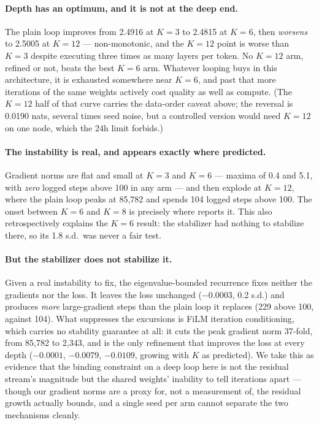 \documentclass[11pt,a4paper]{article}
\begin{document}
\paragraph{Depth has an optimum, and it is not at the deep end.} The plain loop improves from 2.4916
at $K{=}3$ to 2.4815 at $K{=}6$, then \emph{worsens} to 2.5005 at $K{=}12$ --- non-monotonic, and
the $K{=}12$ point is worse than $K{=}3$ despite executing three times as many layers per token. No
$K{=}12$ arm, refined or not, beats the best $K{=}6$ arm. Whatever looping buys in this architecture,
it is exhausted somewhere near $K{=}6$, and past that more iterations of the same weights actively
cost quality as well as compute. (The $K{=}12$ half of that curve carries the data-order caveat
above; the reversal is 0.0190 nats, several times seed noise, but a controlled version would need
$K{=}12$ on one node, which the 24h limit forbids.)

\paragraph{The instability is real, and appears exactly where predicted.} Gradient norms are flat and
small at $K{=}3$ and $K{=}6$ --- maxima of 0.4 and 5.1, with \emph{zero} logged steps above 100 in
any arm --- and then explode at $K{=}12$, where the plain loop peaks at 85{,}782 and spends 104
logged steps above 100. The onset between $K{=}6$ and $K{=}8$ is precisely where \cite{parcae}
reports it. This also retrospectively explains the $K{=}6$ result: the stabilizer had nothing to
stabilize there, so its 1.8 s.d.\ was never a fair test.

\paragraph{But the stabilizer does not stabilize it.} Given a real instability to fix, the
eigenvalue-bounded recurrence fixes neither the gradients nor the loss. It leaves the loss unchanged
($-0.0003$, 0.2 s.d.) and produces \emph{more} large-gradient steps than the plain loop it replaces
(229 above 100, against 104). What suppresses the excursions is FiLM iteration conditioning, which
carries no stability guarantee at all: it cuts the peak gradient norm 37-fold, from 85{,}782 to
2{,}343, and is the only refinement that improves the loss at every depth
($-0.0001$, $-0.0079$, $-0.0109$, growing with $K$ as predicted). We take this as evidence that the
binding constraint on a deep loop here is not the residual stream's magnitude but the shared
weights' inability to tell iterations apart --- though our gradient norms are a proxy for, not a
measurement of, the residual growth \cite{parcae} actually bounds, and a single seed per arm cannot
separate the two mechanisms cleanly.
\end{document}
